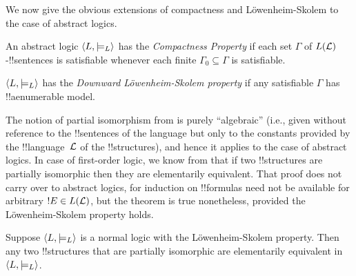 \documentclass[../../include/open-logic-section]{subfiles}
\begin{document}


We now give the obvious extensions of compactness and
L\"owenheim-Skolem to the case of abstract logics. 

\begin{defn}
An abstract logic $\langle L, \models_L \rangle$ has the \emph{Compactness
  Property} if each set $\Gamma$ of $L(\mathcal L)$-!!{sentence}s is
satisfiable whenever each finite $\Gamma_0 \subseteq \Gamma$ is
satisfiable.
\end{defn}

\begin{defn}
$\langle L, \models_L \rangle$ has the \emph{Downward L\"owenheim-Skolem
  property} if any satisfiable $\Gamma$ has !!a{enumerable} model.
\end{defn}


The notion of partial isomorphism from
 is purely ``algebraic'' (i.e.,
given without reference to the !!{sentence}s of the language but only
to the constants provided by the !!{language}~$\mathcal L$ of the
!!{structure}s), and hence it applies to the case of abstract
logics. In case of first-order logic, we know from
 that if two !!{structure}s are partially
isomorphic then they are elementarily equivalent. That proof does not
carry over to abstract logics, for induction on !!{formula}s need not
be available for arbitrary $!E \in L(\mathcal L)$, but the theorem is
true nonetheless, provided the L\"owenheim-Skolem property holds.

\begin{thm}
Suppose $\langle L, \models_L \rangle$ is a normal logic with the
L\"owenheim-Skolem property. Then any two !!{structure}s that are
partially isomorphic are elementarily equivalent in $\langle L,
  \models_L \rangle$.
\end{thm}
\end{document}
